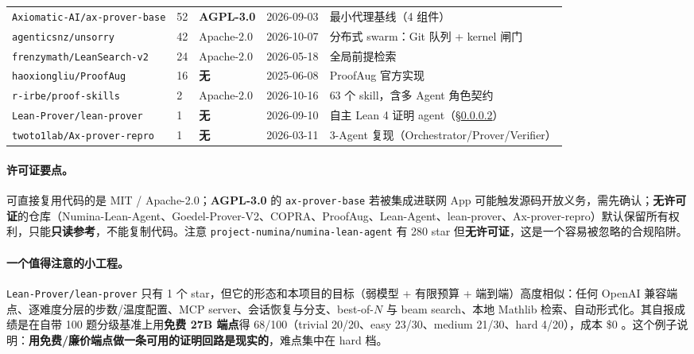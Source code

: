 \documentclass[UTF8,a4paper,11pt,fontset=windows]{ctexart}
\newcommand{\code}[1]{\texttt{#1}}
\begin{document}
{\begin{longtable}{@{}L{4.9cm}L{0.9cm}L{1.9cm}L{1.9cm}L{5.4cm}@{}}
\code{Axiomatic-AI/ax-prover-base} & 52 & \textbf{AGPL-3.0} & 2026-09-03 & 最小代理基线（4 组件）\cite{axprover} \\
\code{agenticsnz/unsorry} & 42 & Apache-2.0 & 2026-10-07 & 分布式 swarm：Git 队列 + kernel 闸门 \cite{unsorry} \\
\code{frenzymath/LeanSearch-v2} & 24 & Apache-2.0 & 2026-05-18 & 全局前提检索 \cite{leansearchv2} \\
\code{haoxiongliu/ProofAug} & 16 & \textbf{无} & 2025-06-08 & ProofAug 官方实现 \cite{proofaug} \\
\code{r-irbe/proof-skills} & 2 & Apache-2.0 & 2026-10-16 & 63 个 skill，含多 Agent 角色契约 \\
\code{Lean-Prover/lean-prover} & 1 & \textbf{无} & 2026-09-10 & 自主 Lean 4 证明 agent（\S\ref{sec:leanprover}）\cite{leanproverrepo} \\
\code{twoto1lab/Ax-prover-repro} & 1 & \textbf{无} & 2026-03-11 & 3-Agent 复现（Orchestrator/Prover/Verifier） \\
\end{longtable}
}

\paragraph{许可证要点。}可直接复用代码的是 MIT / Apache-2.0；\textbf{AGPL-3.0} 的 \code{ax-prover-base} 若被集成进联网 App 可能触发源码开放义务，需先确认；\textbf{无许可证}的仓库（Numina-Lean-Agent、Goedel-Prover-V2、COPRA、ProofAug、Lean-Agent、lean-prover、Ax-prover-repro）默认保留所有权利，只能\textbf{只读参考}，不能复制代码。注意 \code{project-numina/\allowbreak numina-lean-agent} 有 280 star 但\textbf{无许可证}，这是一个容易被忽略的合规陷阱。

\paragraph{一个值得注意的小工程。}\label{sec:leanprover}\code{Lean-Prover/lean-prover} 只有 1 个 star，但它的形态和本项目的目标（弱模型 + 有限预算 + 端到端）高度相似：任何 OpenAI 兼容端点、逐难度分层的步数/温度配置、MCP server、会话恢复与分支、best-of-$N$ 与 beam search、本地 Mathlib 检索、自动形式化。其自报成绩是在自带 100 题分级基准上用\textbf{免费 27B 端点}得 68/100（trivial 20/20、easy 23/30、medium 21/30、hard 4/20），成本 \$0 \cite{leanproverrepo}。这个例子说明：\textbf{用免费/廉价端点做一条可用的证明回路是现实的}，难点集中在 hard 档。

\end{document}
